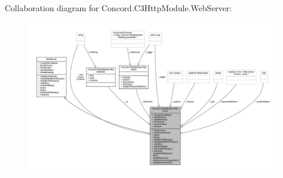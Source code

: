 Collaboration diagram for Concord.\+C3\+Http\+Module.\+Web\+Server\+:
\nopagebreak
\begin{figure}[H]
\begin{center}
\leavevmode
\includegraphics[width=350pt]{class_concord_1_1_c3_http_module_1_1_web_server__coll__graph}
\end{center}
\end{figure}
